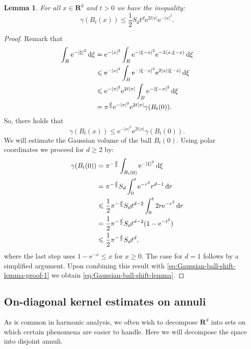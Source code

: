 \documentclass{amsart}
\newtheorem{lemma}{Lemma}
\theoremstyle{remark}
\newcommand{\D}{\,\textup{d}}
\newcommand{\la}{\langle}
\newcommand{\ra}{\rangle}
\renewcommand{\leq}{\leqslant}
\renewcommand{\leq}{\leqslant}
\renewcommand{\geq}{\geqslant}
\newcommand{\R}{\mathbf R}
\newcommand{\e}{\mathrm{e}} %
\renewcommand{\leq}{\leqslant}%
\renewcommand{\geq}{\geqslant}%
\begin{document}
\begin{lemma}\label{lem:Gaussian-ball-shift-lemma}
  For all $x\in\R^d$ and $t>0$ we have the inequality:
  \begin{equation}\label{eq:Gaussian-ball-shift-lemma}
    \gamma(B_t(x)) \leq \frac12 S_d t^{d} \e^{2t|x|} \e^{-|x|^2}. 
  \end{equation}
\end{lemma}
\begin{proof}
  Remark that
  \begin{align*}
    \int_B \e^{-|\xi|^2} \D\xi &= \e^{-|x|^2} \int_{B} \e^{-|\xi -
      x|^2} \e^{-2 \la x, \xi - x \ra} \D\xi\\
    &\leq \e^{-|x|^2} \int_{B} \e^{-|\xi - x|^2} \e^{2 |x| |\xi - x|}
    \D\xi\\
    &\leq \e^{-|x|^2} \e^{2 t|x|} \int_{B} \e^{-|\xi - x|^2} \D\xi\\
    &= \pi^{\frac{d}2} \e^{-|x|^2} \e^{2 t|x|} \gamma(B_t(0)).
  \end{align*}
  So, there holds that
  \begin{equation}\label{eq:Gaussian-ball-shift-lemma-proof-1}
    \gamma(B_t(x)) \leq \e^{-|x|^2} \e^{2 t|x|} \gamma(B_t(0)).
  \end{equation}
  We will estimate the Gaussian volume of the ball $B_t(0)$. Using polar coordinates
  we proceed for $d \geq 2$ by: 
  \begin{align*}
    \gamma(B_t(0)) &= \pi^{-\frac{d}2} \int_{B_t(0)} \e^{-|\xi|^2} \D\xi\\
    &=\pi^{-\frac{d}2}S_d \int_0^t \e^{-r^2} r^{d - 1} \D{r}\\
    &\leq\frac12 \pi^{-\frac{d}2}S_d t^{d-2} \int_0^t 2r \e^{-r^2} \D{r}\\
    &= \frac12 \pi^{-\frac{d}2}S_d t^{d-2} (1-\e^{-t^2})\\
    &\leq \frac12 \pi^{-\frac{d}2}S_d t^{d},
  \end{align*}
  where the last step uses $1-\e^{-x} \leq x$ for $x\geq 0$. The case
  for $d = 1$ follows by a simplified argument.
  Upon combining this result with
  \eqref{eq:Gaussian-ball-shift-lemma-proof-1} we obtain
  \eqref{eq:Gaussian-ball-shift-lemma}.
\end{proof}

\subsection{On-diagonal kernel estimates on annuli}
As is common in harmonic analysis, we often wish to decompose
$\R^d$ into sets on which certain phenomena are easier to handle. Here
we will decompose the space into disjoint annuli. 
\end{document}

